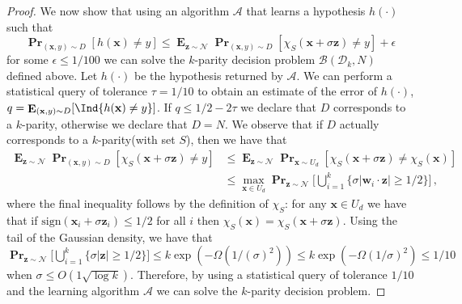 \documentclass{theoretics}
\renewcommand\vec[1]{\mathbf{#1}}
\DeclareMathOperator*{\pr}{\mathbf{Pr}}
\DeclareMathOperator*{\E}{\mathbf{E}}
\newcommand{\normal}{\mathcal{N}}
\newcommand{\sign}{\mathrm{sign}}
\newcommand{\1}{\Ind}
\newcommand{\x}{\vec x}
\newcommand{\z}{\vec z}
\begin{document}
\begin{proof}
We now show that using an algorithm $\mathcal{A}$ that 
learns a hypothesis $h(\cdot)$ such that %
\[\pr_{(\x, y) \sim D}[ h( \x) \neq y] \leq 
\E_{\z \sim \normal} \pr_{(\x, y) \sim D}[  \chi_S(\x+\sigma \z) \neq y] + \epsilon\] for some $\epsilon \leq 1/100$ we can solve the $k$-parity decision problem $\mathcal{B}(\mathcal D_k, N)$ defined above.  Let $h(\cdot)$ be the hypothesis returned 
by $\mathcal A$.   We can perform a statistical query
of tolerance $\tau = 1/10$ to obtain an estimate of the
error of $h(\cdot)$, $q = \E_{( \x, y) \sim D}[\1\{h(\x) \neq y\}]$.  If $q \leq 1/2 - 2\tau$ we declare that $D$ corresponds to a $k$-parity, otherwise we declare 
that $D = N$.  We observe that if $D$ actually corresponds to a $k$-parity(with set $S$), then we have that 
\begin{align*}
\E_{\z \sim \normal} \pr_{(\x, y) \sim D}[ \chi_S(\x
+ \sigma  \vec z ) \neq y]
&\leq 
\E_{\z \sim \normal} \pr_{\x \sim U_d}[ \chi_S(\x+\sigma\z)\neq \chi_S(\x) ]
\\
&\leq \max_{\x \in U_d}
\pr_{\z \sim \normal} \Big[ \bigcup_{i=1}^k \Big\{ \sigma |\vec w_i \cdot \vec z| \geq 1/2 \Big\} \Big ] \,,
\end{align*}
where the final inequality follows by the definition of $\chi_S$: for any  $\x \in U_d$ we have that if $\sign(\x_i+\sigma \z_i)\leq 1/2 $ for all $i$ then $\chi_S(\x)=\chi_S(\x+\sigma \z)$.
Using the tail of the Gaussian density, we have that
$
\pr_{\z \sim \normal} \Big[ \bigcup_{i=1}^k \Big\{ \sigma |\vec z| \geq 1/2 \Big\} \Big ]
\leq k \exp(-\Omega(1/(\sigma)^2 ))
\leq k \exp(-\Omega(1/\sigma)^2 )
\leq 1/10$ when $\sigma\leq O(1\sqrt{\log k})$. Therefore, by using a statistical query of tolerance $1/10$ and the learning algorithm $\mathcal{A}$ we can solve the $k$-parity decision problem.  
\end{proof}
\end{document}
